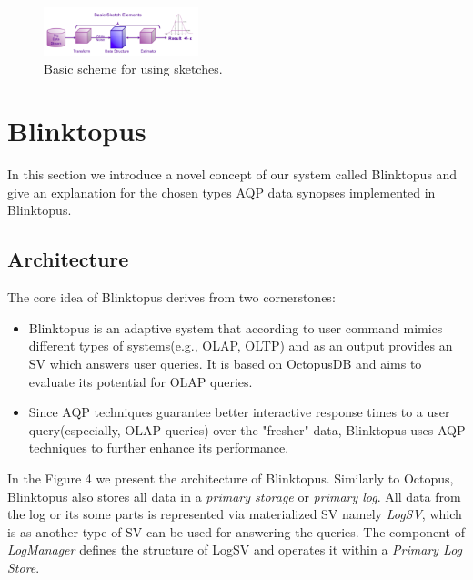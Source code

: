 \documentclass[10pt, conference, compsocconf]{IEEEtran}
\begin{document}
\label{fig:sketches}

\begin{figure} \includegraphics[width=0.4\textwidth, center]{img/distinct_count_sketches.png} 
\caption[Basic scheme for using sketches.]%
{Basic scheme for using sketches.\footnotemark}
\end{figure}

\section{Blinktopus}
In this section we introduce a novel concept of our system called Blinktopus and give an explanation for the chosen types AQP data synopses implemented in Blinktopus.  

\subsection{Architecture}

The core idea of Blinktopus derives from two cornerstones:
\begin{itemize}
\item{Blinktopus is an adaptive system that according to user command mimics different types of systems(e.g., OLAP, OLTP) and as an output provides an SV which answers user queries. It is based on OctopusDB and aims to evaluate its potential for OLAP queries.}
\item{Since AQP techniques guarantee better interactive response times to a user query(especially, OLAP queries) over the "fresher" data, Blinktopus uses AQP techniques to further enhance its performance.}
\end{itemize}

In the Figure 4 we present the architecture of Blinktopus. Similarly to Octopus, Blinktopus also stores all data in a \textit{primary storage} or \textit{primary log}.
All data from the log or its some parts is represented via materialized SV namely \textit{LogSV}, which is as another type of SV can be used for answering the queries. The component of \textit{LogManager} defines the structure of LogSV and operates it within a \textit{Primary Log Store}. 
\end{document}
